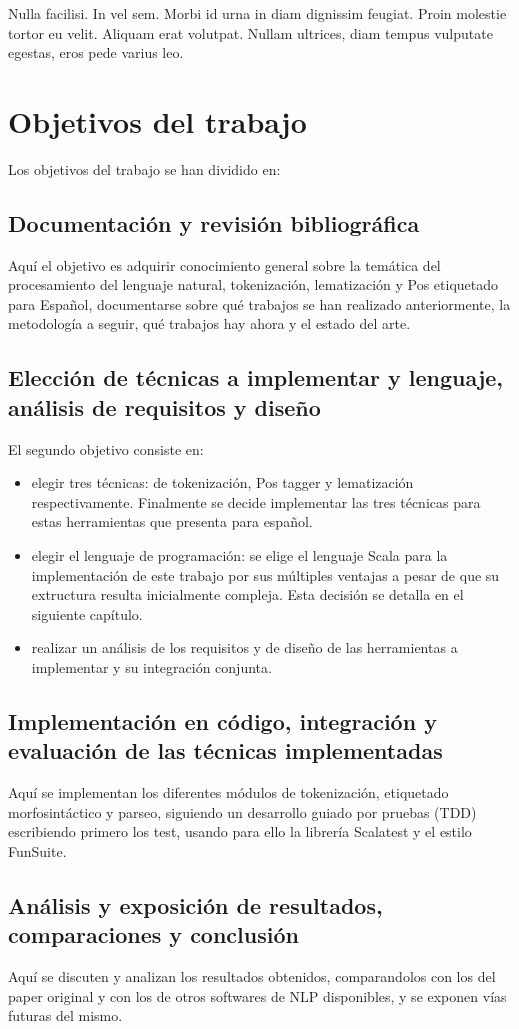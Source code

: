 \begin{savequote}[75mm]
Nulla facilisi. In vel sem. Morbi id urna in diam dignissim feugiat. Proin molestie tortor eu velit. Aliquam erat volutpat. Nullam ultrices, diam tempus vulputate egestas, eros pede varius leo.
\end{savequote}

\chapter{Objetivos del trabajo}
Los objetivos del trabajo se han dividido en: 
\section{Documentación y revisión bibliográfica}
Aquí el objetivo es adquirir conocimiento general sobre la temática del procesamiento del lenguaje natural, tokenización, lematización y Pos etiquetado para Español, documentarse sobre qué trabajos se han realizado anteriormente, la metodología a seguir, qué trabajos hay ahora y el estado del arte. 
\section{Elección de técnicas a implementar y lenguaje, análisis de requisitos y diseño}
El segundo objetivo consiste en:
\begin{itemize}
\item elegir tres técnicas: de tokenización, Pos tagger y lematización respectivamente. Finalmente se decide implementar las tres técnicas para estas herramientas que presenta \citet{smedt2012pattern} para español.
\item elegir el lenguaje de programación: se elige el lenguaje Scala para la implementación de este trabajo por sus múltiples ventajas a pesar de que su extructura resulta inicialmente compleja. Esta decisión se detalla en el siguiente capítulo.
\item realizar un análisis de los requisitos y de diseño de las herramientas a implementar y su integración conjunta.
\end{itemize}

\section{Implementación en código, integración y evaluación de las técnicas implementadas}
Aquí se implementan los diferentes módulos de tokenización, etiquetado morfosintáctico y parseo, siguiendo un desarrollo guiado por pruebas (TDD) escribiendo primero los test, usando para ello la librería Scalatest y el estilo FunSuite. 

\section{Análisis y exposición de resultados, comparaciones y conclusión}   
Aquí se discuten y analizan los resultados obtenidos, comparandolos con los del paper original y con los de otros softwares de NLP disponibles, y se exponen vías futuras del mismo. 


